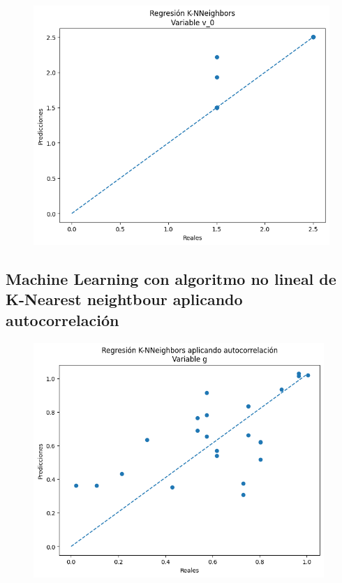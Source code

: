 \documentclass[oneside,openright,titlepage,numbers=noenddot,openany,headinclude,footinclude=true,
cleardoublepage=empty,abstractoff,BCOR=5mm,paper=a4,fontsize=12pt,main=spanish]{scrreprt}
\begin{document}
\begin{figure}[H]
	\centering
	\includegraphics[width=12cm]{Regresión K-NNeighbors Variable v_0.png}
\end{figure}

\subsection{Machine Learning con algoritmo no lineal de K-Nearest neightbour aplicando autocorrelación}

\begin{figure}[H]
	\centering
	\includegraphics[width=11cm]{Regresión K-NNeighbors aplicando autocorrelación Variable g.png}
\end{figure}
\end{document}

